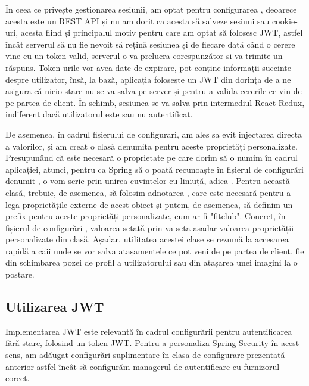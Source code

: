 În ceea ce privește gestionarea sesiunii, am optat pentru configurarea , deoarece acesta este un REST API și nu am dorit ca acesta să salveze sesiuni sau cookie-uri, acesta fiind și principalul motiv pentru care am optat să folosesc JWT, astfel încât serverul să nu fie nevoit să rețină sesiunea și de fiecare dată când o cerere vine cu un token valid, serverul o va prelucra corespunzător si va trimite un răspuns. Token-urile vor avea date de expirare, pot conține informații succinte despre utilizator, însă, la bază, aplicația folosește un JWT din dorința de a ne asigura că nicio stare nu se va salva pe server și pentru a valida cererile ce vin de pe partea de client. În schimb, sesiunea se va salva prin intermediul React Redux, indiferent dacă utilizatorul este sau nu autentificat.\newline

De asemenea, în cadrul fișierului de configurări, am ales sa evit injectarea directa a valorilor, și am creat o clasă denumita  pentru aceste proprietăți personalizate. Presupunând că este necesară o proprietate pe care dorim să o numim  în cadrul aplicației, atunci, pentru ca Spring să o poată recunoaște în fișierul de configurări denumit , o vom scrie prin unirea cuvintelor cu liniuță, adica .
Pentru această clasă, trebuie, de asemenea, să folosim adnotarea , care este necesară pentru a lega proprietățile externe de acest obiect și putem, de asemenea, să definim un prefix pentru aceste proprietăți personalizate, cum ar fi "fitclub". Concret, în fișierul de configurări , valoarea setată prin  va seta așadar valoarea proprietății personalizate din clasă.\newline 
Așadar, utilitatea acestei clase se rezumă la accesarea rapidă a căii unde se vor salva atașamentele ce pot veni de pe partea de client, fie din schimbarea pozei de profil a utilizatorului sau din atașarea unei imagini la o postare.\newline

\subsection{Utilizarea JWT}

Implementarea JWT este relevantă în cadrul configurării pentru autentificarea fără stare, folosind un token JWT. Pentru a personaliza Spring Security în acest sens, am adăugat configurări suplimentare în clasa de configurare prezentată anterior astfel încât să configurăm managerul de autentificare cu furnizorul corect.\newline

